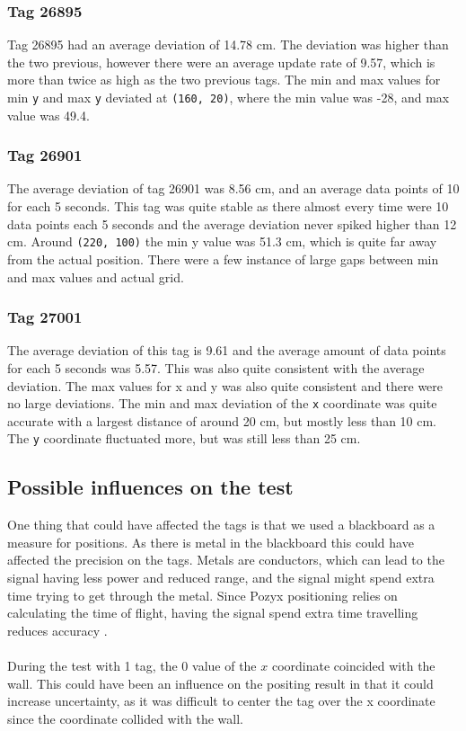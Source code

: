\subsubsection{Tag 26895}
Tag 26895 had an average deviation of 14.78 cm. 
The deviation was higher than the two previous, however there were an average update rate of 9.57, which is more than twice as high as the two previous tags.
The min and max values for min \texttt{y} and max \texttt{y} deviated at \texttt{(160, 20)}, where the min value was -28, and max value was 49.4.

\subsubsection{Tag 26901}
The average deviation of tag 26901 was 8.56 cm, and an average data points of 10 for each 5 seconds.
This tag was quite stable as there almost every time were 10 data points each 5 seconds and the average deviation never spiked higher than 12 cm.
Around \texttt{(220, 100)} the min y value was 51.3 cm, which is quite far away from the actual position.
There were a few instance of large gaps between min and max values and actual grid.

\subsubsection{Tag 27001}
The average deviation of this tag is 9.61 and the average amount of data points for each 5 seconds was 5.57.
This was also quite consistent with the average deviation. 
The max values for x and y was also quite consistent and there were no large deviations.
The min and max deviation of the \texttt{x} coordinate was quite accurate with a largest distance of around 20 cm, but mostly less than 10 cm.
The \texttt{y} coordinate fluctuated more, but was still less than 25 cm.

\subsection{Possible influences on the test}
One thing that could have affected the tags is that we used a blackboard as a measure for positions. 
As there is metal in the blackboard this could have affected the precision on the tags.
Metals are conductors, which can lead to the signal having less power and reduced range, and the signal might spend extra time trying to get through the metal.
Since Pozyx positioning relies on calculating the time of flight, having the signal spend extra time travelling reduces accuracy \cite{pozyx-UWBObstacles}. 
\\\\
During the test with 1 tag, the 0 value of the $x$ coordinate coincided with the wall. 
This could have been an influence on the positing result in that it could increase uncertainty, as it was difficult to center the tag over the x coordinate since the coordinate collided with the wall.

